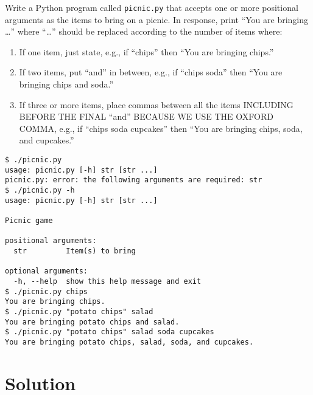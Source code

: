\documentclass[]{article}
\providecommand{\tightlist}{%
  \setlength{\itemsep}{0pt}\setlength{\parskip}{0pt}}
\begin{document}
Write a Python program called \texttt{picnic.py} that accepts one or
more positional arguments as the items to bring on a picnic. In
response, print ``You are bringing \ldots{}'' where ``\ldots{}'' should
be replaced according to the number of items where:

\begin{enumerate}
\def\labelenumi{\arabic{enumi}.}
\tightlist
\item
  If one item, just state, e.g., if ``chips'' then ``You are bringing
  chips.''
\item
  If two items, put ``and'' in between, e.g., if ``chips soda'' then
  ``You are bringing chips and soda.''
\item
  If three or more items, place commas between all the items INCLUDING
  BEFORE THE FINAL ``and'' BECAUSE WE USE THE OXFORD COMMA, e.g., if
  ``chips soda cupcakes'' then ``You are bringing chips, soda, and
  cupcakes.''
\end{enumerate}

\begin{verbatim}
$ ./picnic.py
usage: picnic.py [-h] str [str ...]
picnic.py: error: the following arguments are required: str
$ ./picnic.py -h
usage: picnic.py [-h] str [str ...]

Picnic game

positional arguments:
  str         Item(s) to bring

optional arguments:
  -h, --help  show this help message and exit
$ ./picnic.py chips
You are bringing chips.
$ ./picnic.py "potato chips" salad
You are bringing potato chips and salad.
$ ./picnic.py "potato chips" salad soda cupcakes
You are bringing potato chips, salad, soda, and cupcakes.
\end{verbatim}

\pagebreak

\hypertarget{solution-3}{%
\section{Solution}\label{solution-3}}
\end{document}
